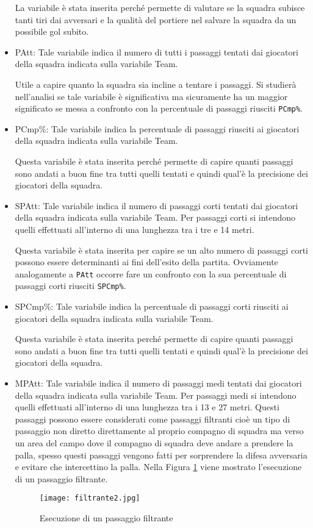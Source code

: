 \begin{itemize}
	La variabile è stata inserita perché permette di valutare se la squadra subisce tanti tiri dai avversari e la qualità del portiere nel salvare la squadra da un possibile gol subito.
	\item \textsf{PAtt}: Tale variabile indica il numero di tutti i passaggi tentati dai giocatori della squadra indicata sulla variabile \textsf{Team}. 
	
	Utile a capire quanto la squadra sia incline a tentare i passaggi. Si studierà nell'analisi se tale variabile è significativa ma sicuramente ha un maggior significato se messa a confronto con la percentuale di passaggi riusciti \texttt{PCmp\%}.
	\item\textsf{PCmp\%}: Tale variabile indica la percentuale di passaggi riusciti ai giocatori della squadra indicata sulla variabile \textsf{Team}. 
	
	Questa variabile è stata inserita perché permette di capire quanti passaggi sono andati a buon fine tra tutti quelli tentati e quindi qual'è la precisione dei giocatori della squadra.
	\item \textsf{SPAtt}: Tale variabile indica il numero di passaggi corti tentati dai giocatori della squadra indicata sulla variabile \textsf{Team}. Per passaggi corti si intendono quelli effettuati all'interno di una lunghezza tra i tre e 14 metri.
	
	Questa variabile è stata inserita per capire se un alto numero di passaggi corti possono essere determinanti ai fini dell'esito della partita. Ovviamente analogamente a \texttt{PAtt} occorre fare un confronto con la sua percentuale di passaggi corti riusciti \texttt{SPCmp\%}.
	\item \textsf{SPCmp\%}: Tale variabile indica la percentuale di passaggi corti riusciti ai giocatori della squadra indicata sulla variabile \textsf{Team}. 
	
	Questa variabile è stata inserita perché permette di capire quanti passaggi sono andati a buon fine tra tutti quelli tentati e quindi qual'è la precisione dei giocatori della squadra.
	\item \textsf{MPAtt}: Tale variabile indica il numero di passaggi medi tentati dai giocatori della squadra indicata sulla variabile \textsf{Team}. Per passaggi medi si intendono quelli effettuati all'interno di una lunghezza tra i 13 e 27 metri. Questi passaggi possono essere considerati come passaggi filtranti cioè un tipo di passaggio non diretto direttamente al proprio compagno di squadra ma verso un area del campo dove il compagno di squadra deve andare a prendere la palla, spesso questi passaggi vengono fatti per sorprendere la difesa avversaria e evitare che intercettino la palla. Nella Figura \ref{fig:filt} viene mostrato l'esecuzione di un passaggio filtrante.
	\begin{figure}[h]
		\begin{center}
			\texttt{[image: filtrante2.jpg]}
			\caption{Esecuzione di un passaggio filtrante} \label{fig:filt}
		\end{center}
	\end{figure}


\end{itemize}
